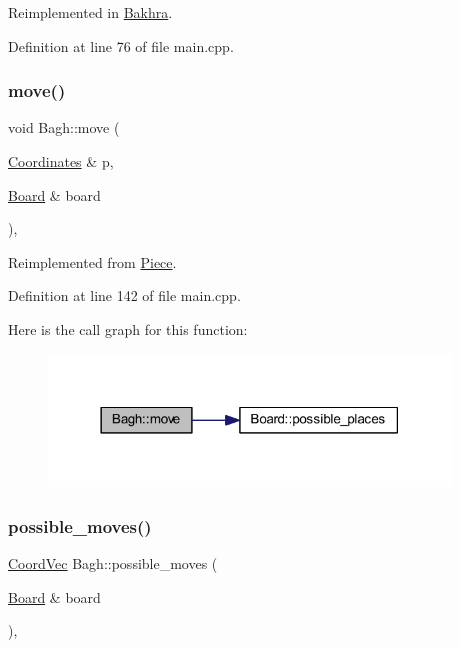 Reimplemented in \mbox{\hyperlink{class_bakhra_a851d699afa7dc2180e1aaf18bd6160f9}{Bakhra}}.



Definition at line 76 of file main.\+cpp.

\mbox{\label{class_bagh_a31917bfad63a224e336bcdfaed2e5361}} 
\subsubsection{\texorpdfstring{move()}{move()}}
{\footnotesize\ttfamily void Bagh\+::move (\begin{DoxyParamCaption}\item[{\mbox{\hyperlink{class_coordinates}{Coordinates}} \&}]{p,  }\item[{\mbox{\hyperlink{class_board}{Board}} \&}]{board }\end{DoxyParamCaption})\hspace{0.3cm}{\ttfamily [inline]}, {\ttfamily [virtual]}}



Reimplemented from \mbox{\hyperlink{class_piece_a926422c76f09a9f0df374462ad8d13c1}{Piece}}.



Definition at line 142 of file main.\+cpp.

Here is the call graph for this function\+:
\nopagebreak
\begin{figure}[H]
\begin{center}
\leavevmode
\includegraphics[width=302pt]{class_bagh_a31917bfad63a224e336bcdfaed2e5361_cgraph}
\end{center}
\end{figure}
\mbox{\label{class_bagh_ad98b7e209113ed6e5932ad732283b66a}} 
\subsubsection{\texorpdfstring{possible\_moves()}{possible\_moves()}}
{\footnotesize\ttfamily \mbox{\hyperlink{main_8cpp_a267937870648899c879128d3199195ec}{Coord\+Vec}} Bagh\+::possible\+\_\+moves (\begin{DoxyParamCaption}\item[{\mbox{\hyperlink{class_board}{Board}} \&}]{board }\end{DoxyParamCaption})\hspace{0.3cm}{\ttfamily [inline]}, {\ttfamily [virtual]}}



